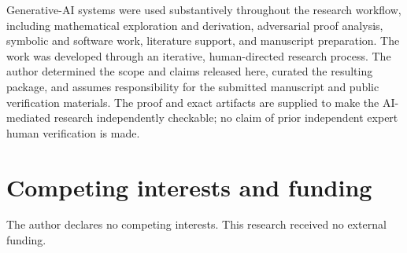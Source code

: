 \documentclass[11pt]{article}
\theoremstyle{definition}
\begin{document}
Generative-AI systems were used substantively throughout the research
workflow, including mathematical exploration and derivation, adversarial
proof analysis, symbolic and software work, literature support, and
manuscript preparation. The work was developed through an iterative,
human-directed research process. The author determined the scope and claims
released here, curated the resulting package, and assumes responsibility for
the submitted manuscript and public verification materials. The proof and
exact artifacts are supplied to make the AI-mediated research independently
checkable; no claim of prior independent expert human verification is made.

\section*{Competing interests and funding}

The author declares no competing interests. This research received no
external funding.

\appendix


\begingroup
\small
\setlength{\bibsep}{2pt}


\endgroup
\end{document}
